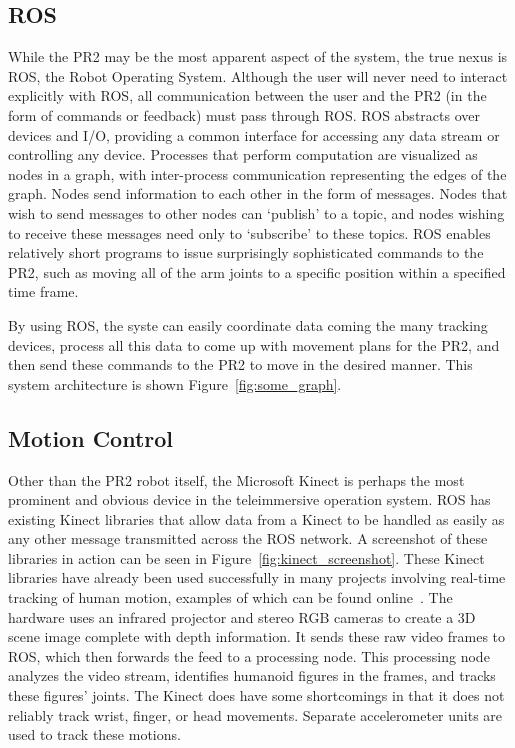 \documentclass{sig-alternate}
\begin{document}
\subsection{ROS}
\label{sec:model_ros}
While the PR2 may be the most apparent aspect of the system,
the true nexus is ROS, the Robot Operating System. Although the
user will never need to interact explicitly with ROS, all communication between
the user and the PR2 (in the form of commands or feedback) must pass through ROS.
ROS abstracts over devices and I/O, providing a common interface for accessing
any data stream or controlling any device. Processes that perform computation are visualized as nodes in a graph, with inter-process communication representing the
edges of the graph. Nodes send information to each other in the form of messages. Nodes that wish to send messages to other nodes can
`publish' to a topic, and nodes wishing to receive these messages need only to `subscribe' to these topics. ROS enables relatively short
programs to issue surprisingly sophisticated commands to the PR2, such as moving all of the arm joints to a specific position within a
specified time frame.

By using ROS, the syste can easily coordinate
data coming the many tracking devices, process all this data to come up with
movement plans for the PR2, and then send these commands to the PR2 to move in the
desired manner. This system architecture is shown Figure~\ref{fig:some_graph}.

\subsection{Motion Control}
\label{sec:model_motion}
Other than the PR2 robot itself, the Microsoft Kinect is perhaps the most 
prominent and obvious device in the teleimmersive operation system. ROS has 
existing Kinect libraries that allow
data from a Kinect to be handled as easily as any other message transmitted across the ROS network. A screenshot
of these libraries in action can be seen in Figure~\ref{fig:kinect_screenshot}.
These Kinect libraries have already been used successfully in 
many projects involving real-time tracking of human motion, examples of which can be found online~\cite{freenect}.
The hardware uses an 
infrared projector and stereo RGB cameras to create a 3D scene image complete
with depth information. It sends these raw video frames to ROS, which then
forwards the feed to a processing node. This processing node analyzes the 
video stream, identifies humanoid figures in the frames, and tracks these 
figures' joints. The Kinect does have some shortcomings in that it does 
not reliably track wrist, finger, or head movements. Separate 
accelerometer units are used to track these motions.
\end{document}
